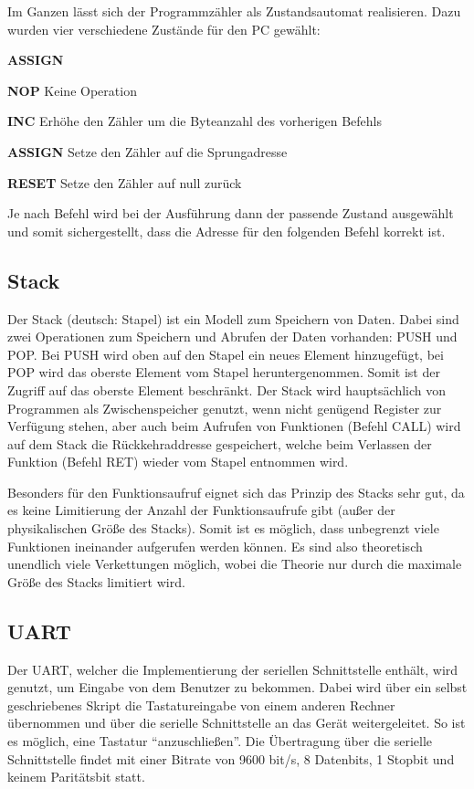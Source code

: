 Im Ganzen lässt sich der Programmzähler als Zustandsautomat realisieren. Dazu
wurden vier verschiedene Zustände für den \ac{PC} gewählt:

\begin{labeling}{\textbf{ASSIGN}}
\item[\textbf{NOP}]		Keine Operation
\item[\textbf{INC}]		Erhöhe den Zähler um die Byteanzahl des vorherigen Befehls
\item[\textbf{ASSIGN}]	Setze den Zähler auf die Sprungadresse
\item[\textbf{RESET}]	Setze den Zähler auf null zurück
\end{labeling}

Je nach Befehl wird bei der Ausführung dann der passende Zustand ausgewählt und
somit sichergestellt, dass die Adresse für den folgenden Befehl korrekt ist.
\subsection{Stack}
\label{s:stack}
Der Stack (deutsch: Stapel) ist ein Modell zum Speichern von Daten. Dabei sind
zwei Operationen zum Speichern und Abrufen der Daten vorhanden: PUSH und POP\@.
Bei PUSH wird oben auf den Stapel ein neues Element hinzugefügt, bei POP wird
das oberste Element vom Stapel heruntergenommen. Somit ist der Zugriff auf das
oberste Element beschränkt. Der Stack wird hauptsächlich von Programmen als
Zwischenspeicher genutzt, wenn nicht genügend Register zur Verfügung stehen,
aber auch beim Aufrufen von Funktionen (Befehl CALL) wird auf dem Stack die
Rückkehraddresse gespeichert, welche beim Verlassen der Funktion (Befehl RET)
wieder vom Stapel entnommen wird.

Besonders für den Funktionsaufruf eignet sich das Prinzip des Stacks sehr gut,
da es keine Limitierung der Anzahl der Funktionsaufrufe gibt (außer der
physikalischen Größe des Stacks). Somit ist es möglich, dass unbegrenzt viele
Funktionen ineinander aufgerufen werden können. Es sind also theoretisch
unendlich viele Verkettungen möglich, wobei die Theorie nur durch die maximale
Größe des Stacks limitiert wird.

\subsection{UART}
\label{s:uart}
Der \ac{UART}, welcher die Implementierung der seriellen Schnittstelle enthält,
wird genutzt, um Eingabe von dem Benutzer zu bekommen. Dabei wird über ein
selbst geschriebenes Skript die Tastatureingabe von einem anderen Rechner
übernommen und über die serielle Schnittstelle an das Gerät weitergeleitet. So
ist es möglich, eine Tastatur "`anzuschließen"'. Die Übertragung über die serielle
Schnittstelle findet mit einer Bitrate von 9600 bit/s, 8 Datenbits, 1 Stopbit
und keinem Paritätsbit statt.

